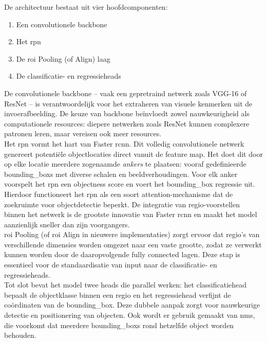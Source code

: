 De architectuur bestaat uit vier hoofdcomponenten:

\begin{enumerate}
    \item Een convolutionele backbone
    \item Het \gls{rpn}
    \item De \gls{roi} Pooling (of Align) laag
    \item De classificatie- en regressieheads
\end{enumerate}

De convolutionele backbone -- vaak een gepretraind netwerk zoals VGG-16 of ResNet -- is verantwoordelijk voor het extraheren van visuele kenmerken uit de invoerafbeelding. De keuze van backbone beïnvloedt zowel nauwkeurigheid als computationele resources: diepere netwerken zoals ResNet kunnen complexere patronen leren, maar vereisen ook meer resources. \\

Het \gls{rpn} vormt het hart van Faster \gls{rcnn}. Dit volledig convolutionele netwerk genereert potentiële objectlocaties direct vanuit de feature map. Het doet dit door op elke locatie meerdere zogenaamde \emph{ankers} te plaatsen: vooraf gedefinieerde \glspl{bounding_box} met diverse schalen en beeldverhoudingen. Voor elk anker voorspelt het \gls{rpn} een objectness score en voert het \gls{bounding_box} regressie uit. Hierdoor functioneert het \gls{rpn} als een soort attention-mechanisme dat de zoekruimte voor objectdetectie beperkt. De integratie van regio-voorstellen binnen het netwerk is de grootste innovatie van Faster \gls{rcnn} en maakt het model aanzienlijk sneller dan zijn voorgangers. \\

\gls{roi} Pooling (of \gls{roi} Align in nieuwere implementaties) zorgt ervoor dat regio’s van verschillende dimensies worden omgezet naar een vaste grootte, zodat ze verwerkt kunnen worden door de daaropvolgende fully connected lagen. Deze stap is essentieel voor de standaardisatie van input naar de classificatie- en regressieheads. \\

Tot slot bevat het model twee heads die parallel werken: het classificatiehead bepaalt de objectklasse binnen een regio en het regressiehead verfijnt de coördinaten van de \gls{bounding_box}. Deze dubbele aanpak zorgt voor nauwkeurige detectie en positionering van objecten. Ook wordt er gebruik gemaakt van \gls{nms}, die voorkomt dat meerdere \glspl{bounding_box} rond hetzelfde object worden behouden. \\

